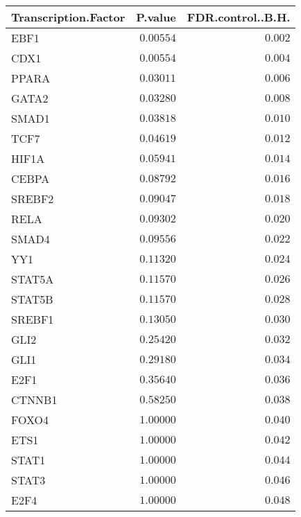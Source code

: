 \begin{table}[!tbp]
\begin{center}
\begin{tabular}{lrr}
\toprule
\multicolumn{1}{c}{Transcription.Factor}&\multicolumn{1}{c}{P.value}&\multicolumn{1}{c}{FDR.control..B.H.}\tabularnewline
\midrule
EBF1&$0.00554$&$0.002$\tabularnewline
CDX1&$0.00554$&$0.004$\tabularnewline
PPARA&$0.03011$&$0.006$\tabularnewline
GATA2&$0.03280$&$0.008$\tabularnewline
SMAD1&$0.03818$&$0.010$\tabularnewline
TCF7&$0.04619$&$0.012$\tabularnewline
HIF1A&$0.05941$&$0.014$\tabularnewline
CEBPA&$0.08792$&$0.016$\tabularnewline
SREBF2&$0.09047$&$0.018$\tabularnewline
RELA&$0.09302$&$0.020$\tabularnewline
SMAD4&$0.09556$&$0.022$\tabularnewline
YY1&$0.11320$&$0.024$\tabularnewline
STAT5A&$0.11570$&$0.026$\tabularnewline
STAT5B&$0.11570$&$0.028$\tabularnewline
SREBF1&$0.13050$&$0.030$\tabularnewline
GLI2&$0.25420$&$0.032$\tabularnewline
GLI1&$0.29180$&$0.034$\tabularnewline
E2F1&$0.35640$&$0.036$\tabularnewline
CTNNB1&$0.58250$&$0.038$\tabularnewline
FOXO4&$1.00000$&$0.040$\tabularnewline
ETS1&$1.00000$&$0.042$\tabularnewline
STAT1&$1.00000$&$0.044$\tabularnewline
STAT3&$1.00000$&$0.046$\tabularnewline
E2F4&$1.00000$&$0.048$\tabularnewline
\bottomrule
\end{tabular}\end{center}

\end{table}
